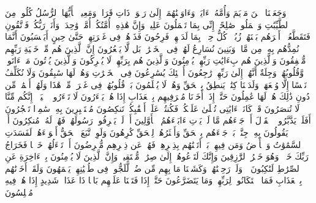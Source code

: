 \stopbuffer
\startbuffer[\q:23:50]
وَجَعَلۡنَا ٱبۡنَ مَرۡیَمَ وَأُمَّهُۥۤ ءَایَةࣰ وَءَاوَیۡنَٰهُمَاۤ إِلَىٰ رَبۡوَةࣲ ذَاتِ قَرَارࣲ وَمَعِینࣲ%
\stopbuffer
\startbuffer[\q:23:51]
یَٰۤأَیُّهَا ٱلرُّسُلُ كُلُوا۟ مِنَ ٱلطَّیِّبَٰتِ وَٱعۡمَلُوا۟ صَٰلِحًاۖ إِنِّی بِمَا تَعۡمَلُونَ عَلِیمࣱ%
\stopbuffer
\startbuffer[\q:23:52]
وَإِنَّ هَٰذِهِۦۤ أُمَّتُكُمۡ أُمَّةࣰ وَٰحِدَةࣰ وَأَنَا۠ رَبُّكُمۡ فَٱتَّقُونِ%
\stopbuffer
\startbuffer[\q:23:53]
فَتَقَطَّعُوۤا۟ أَمۡرَهُم بَیۡنَهُمۡ زُبُرࣰاۖ كُلُّ حِزۡبِۭ بِمَا لَدَیۡهِمۡ فَرِحُونَ%
\stopbuffer
\startbuffer[\q:23:54]
فَذَرۡهُمۡ فِی غَمۡرَتِهِمۡ حَتَّىٰ حِینٍ%
\stopbuffer
\startbuffer[\q:23:55]
أَیَحۡسَبُونَ أَنَّمَا نُمِدُّهُم بِهِۦ مِن مَّالࣲ وَبَنِینَ%
\stopbuffer
\startbuffer[\q:23:56]
نُسَارِعُ لَهُمۡ فِی ٱلۡخَیۡرَٰتِۚ بَل لَّا یَشۡعُرُونَ%
\stopbuffer
\startbuffer[\q:23:57]
إِنَّ ٱلَّذِینَ هُم مِّنۡ خَشۡیَةِ رَبِّهِم مُّشۡفِقُونَ%
\stopbuffer
\startbuffer[\q:23:58]
وَٱلَّذِینَ هُم بِءَایَٰتِ رَبِّهِمۡ یُؤۡمِنُونَ%
\stopbuffer
\startbuffer[\q:23:59]
وَٱلَّذِینَ هُم بِرَبِّهِمۡ لَا یُشۡرِكُونَ%
\stopbuffer
\startbuffer[\q:23:60]
وَٱلَّذِینَ یُؤۡتُونَ مَاۤ ءَاتَوا۟ وَّقُلُوبُهُمۡ وَجِلَةٌ أَنَّهُمۡ إِلَىٰ رَبِّهِمۡ رَٰجِعُونَ%
\stopbuffer
\startbuffer[\q:23:61]
أُو۟لَٰۤئِكَ یُسَٰرِعُونَ فِی ٱلۡخَیۡرَٰتِ وَهُمۡ لَهَا سَٰبِقُونَ%
\stopbuffer
\startbuffer[\q:23:62]
وَلَا نُكَلِّفُ نَفۡسًا إِلَّا وُسۡعَهَاۚ وَلَدَیۡنَا كِتَٰبࣱ یَنطِقُ بِٱلۡحَقِّ وَهُمۡ لَا یُظۡلَمُونَ%
\stopbuffer
\startbuffer[\q:23:63]
بَلۡ قُلُوبُهُمۡ فِی غَمۡرَةࣲ مِّنۡ هَٰذَا وَلَهُمۡ أَعۡمَٰلࣱ مِّن دُونِ ذَٰلِكَ هُمۡ لَهَا عَٰمِلُونَ%
\stopbuffer
\startbuffer[\q:23:64]
حَتَّىٰۤ إِذَاۤ أَخَذۡنَا مُتۡرَفِیهِم بِٱلۡعَذَابِ إِذَا هُمۡ یَجۡءَرُونَ%
\stopbuffer
\startbuffer[\q:23:65]
لَا تَجۡءَرُوا۟ ٱلۡیَوۡمَۖ إِنَّكُم مِّنَّا لَا تُنصَرُونَ%
\stopbuffer
\startbuffer[\q:23:66]
قَدۡ كَانَتۡ ءَایَٰتِی تُتۡلَىٰ عَلَیۡكُمۡ فَكُنتُمۡ عَلَىٰۤ أَعۡقَٰبِكُمۡ تَنكِصُونَ%
\stopbuffer
\startbuffer[\q:23:67]
مُسۡتَكۡبِرِینَ بِهِۦ سَٰمِرࣰا تَهۡجُرُونَ%
\stopbuffer
\startbuffer[\q:23:68]
أَفَلَمۡ یَدَّبَّرُوا۟ ٱلۡقَوۡلَ أَمۡ جَاۤءَهُم مَّا لَمۡ یَأۡتِ ءَابَاۤءَهُمُ ٱلۡأَوَّلِینَ%
\stopbuffer
\startbuffer[\q:23:69]
أَمۡ لَمۡ یَعۡرِفُوا۟ رَسُولَهُمۡ فَهُمۡ لَهُۥ مُنكِرُونَ%
\stopbuffer
\startbuffer[\q:23:70]
أَمۡ یَقُولُونَ بِهِۦ جِنَّةُۢۚ بَلۡ جَاۤءَهُم بِٱلۡحَقِّ وَأَكۡثَرُهُمۡ لِلۡحَقِّ كَٰرِهُونَ%
\stopbuffer
\startbuffer[\q:23:71]
وَلَوِ ٱتَّبَعَ ٱلۡحَقُّ أَهۡوَاۤءَهُمۡ لَفَسَدَتِ ٱلسَّمَٰوَٰتُ وَٱلۡأَرۡضُ وَمَن فِیهِنَّۚ بَلۡ أَتَیۡنَٰهُم بِذِكۡرِهِمۡ فَهُمۡ عَن ذِكۡرِهِم مُّعۡرِضُونَ%
\stopbuffer
\startbuffer[\q:23:72]
أَمۡ تَسۡءَلُهُمۡ خَرۡجࣰا فَخَرَاجُ رَبِّكَ خَیۡرࣱۖ وَهُوَ خَیۡرُ ٱلرَّٰزِقِینَ%
\stopbuffer
\startbuffer[\q:23:73]
وَإِنَّكَ لَتَدۡعُوهُمۡ إِلَىٰ صِرَٰطࣲ مُّسۡتَقِیمࣲ%
\stopbuffer
\startbuffer[\q:23:74]
وَإِنَّ ٱلَّذِینَ لَا یُؤۡمِنُونَ بِٱلۡءَاخِرَةِ عَنِ ٱلصِّرَٰطِ لَنَٰكِبُونَ%
\stopbuffer
\startbuffer[\q:23:75]
۞ وَلَوۡ رَحِمۡنَٰهُمۡ وَكَشَفۡنَا مَا بِهِم مِّن ضُرࣲّ لَّلَجُّوا۟ فِی طُغۡیَٰنِهِمۡ یَعۡمَهُونَ%
\stopbuffer
\startbuffer[\q:23:76]
وَلَقَدۡ أَخَذۡنَٰهُم بِٱلۡعَذَابِ فَمَا ٱسۡتَكَانُوا۟ لِرَبِّهِمۡ وَمَا یَتَضَرَّعُونَ%
\stopbuffer
\startbuffer[\q:23:77]
حَتَّىٰۤ إِذَا فَتَحۡنَا عَلَیۡهِم بَابࣰا ذَا عَذَابࣲ شَدِیدٍ إِذَا هُمۡ فِیهِ مُبۡلِسُونَ%
\stopbuffer
